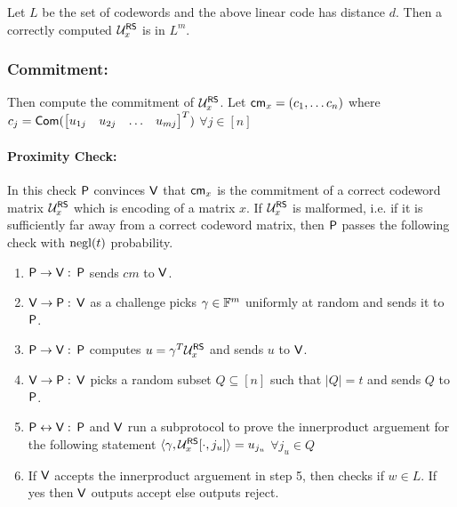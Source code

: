 Let $L$ be the set of codewords and the above linear code has distance $d$. Then a correctly computed $\mathcal{U}^{\mathsf{RS}}_x$ is in $L^m$.

\subsubsection{Commitment:}\label{subsec: commit} Then compute the commitment of $\mathcal{U}^{\mathsf{RS}}_x$. 
Let $\mathsf{cm}_x=(c_1,\ldots c_n)$ where 
$c_j= \mathsf{Com}( \begin{bmatrix}
u_{1j} & u_{2j} & \ldots & u_{mj}
\end{bmatrix}^T)$ $\forall j\in [n]$

\paragraph{\textbf{Proximity Check:}}\label{sec:proximity} In this check $\mathsf{P}$ convinces $\mathsf{V}$ that $\mathsf{cm}_x$ is the commitment of a correct codeword matrix $\mathcal{U}^{\mathsf{RS}}_x$ which is encoding of a matrix $x$. If $\mathcal{U}^{\mathsf{RS}}_x$ is malformed, i.e. if it is sufficiently far away from a correct codeword matrix, then $\mathsf{P}$ passes the following check with $\mathrm{negl}(t)$ probability.
\begin{enumerate}
	\item $\mathsf{P} \rightarrow \mathsf{V} :$ $\mathsf{P}$ sends $cm$ to $\mathsf{V}$.
	
	\item $\mathsf{V} \rightarrow \mathsf{P} :$ $\mathsf{V}$ as a challenge picks $\gamma \in \mathbb{F}^m$ uniformly at random and sends it to $\mathsf{P}$.
	
	\item $\mathsf{P} \rightarrow \mathsf{V} :$ $\mathsf{P}$ computes $u=\gamma^T\mathcal{U}^{\mathsf{RS}}_x$ and sends $u$ to $\mathsf{V}$.
	
	\item $\mathsf{V} \rightarrow \mathsf{P} :$ $\mathsf{V}$ picks a random subset $Q\subseteq [n]$ such that $|Q|=t$ and sends $Q$ to $\mathsf{P}$.
	
	\item $\mathsf{P} \leftrightarrow \mathsf{V}: $ $\mathsf{P}$ and $\mathsf{V}$ run a subprotocol to prove the innerproduct arguement for the following statement $\langle \gamma,\mathcal{U}^{\mathsf{RS}}_x[\cdot,j_u]\rangle=u_{j_u}$ $\forall j_u\in Q$
	
	\item If $\mathsf{V}$ accepts the innerproduct arguement in step 5, then checks if $w\in L$. If yes then $\mathsf{V}$ outputs accept else outputs reject.
\end{enumerate}


